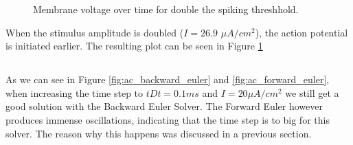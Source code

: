 \documentclass{article}
\begin{document}
\begin{figure}[htbp]
\begin{minipage}[b]{0.49\textwidth}
            \caption{Membrane voltage over time for double the spiking threshhold.}
            \label{fig:double_threshold_amplitudes}
        \end{minipage}
    \end{figure}

    When the stimulus amplitude is doubled ($I = 26.9$ $\mu A/cm^2$), the action potential is initiated earlier.
    The resulting plot can be seen in Figure \ref{fig:double_threshold_amplitudes}

    \subsection{}

    As we can see in Figure \ref{fig:ac_backward_euler} and \ref{fig:ac_forward_euler}, when increasing the time step to $tDt = 0.1 ms$ and $I = 20\mu A/cm^2$ we still get a good solution with the Backward Euler Solver.
    The Forward Euler however produces immense oscillations, indicating that the time step is to big for this solver.
    The reason why this happens was discussed in a previous section.
\end{document}
